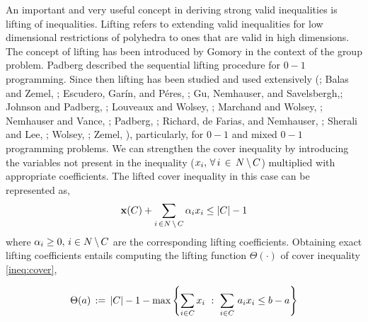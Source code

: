 \documentclass[10pt,twoside]{amsart}
\begin{document}
An important and very useful concept in deriving strong valid inequalities is lifting of inequalities. Lifting refers to extending valid inequalities for low dimensional restrictions of polyhedra to ones that are valid in high dimensions. The concept of lifting has been introduced by Gomory \cite{Gomory1969451} in the context of the group problem. Padberg \cite{Padberg75} described the sequential lifting procedure for $0-1$ programming. Since then lifting has been studied and used extensively (\atam \cite{Atamturk04}; Balas and Zemel, \cite{Balas1978}; Escudero, Gar\'{i}n, and P\'{e}res, \cite{Escudero2003211}; Gu, Nemhauser, and Savelsbergh,\cite{Gu1998,Gu1999a,Gu1999b,Gu2000}; Johnson and Padberg, \cite{Johnson198118}; Louveaux and Wolsey, \cite{Louveaux07}; Marchand and Wolsey, \cite{Marchand99}; Nemhauser and Vance, \cite{Nemhauser1994}; Padberg, \cite{Padberg73}; Richard, de Farias, and Nemhauser, \cite{JP2002}; Sherali and Lee, \cite{Sherali95}; Wolsey, \cite{Wolsey1975,Wolsey77}; Zemel, \cite{Zemel78,Zemel89}), particularly, for $0-1$ and mixed $0-1$ programming problems. We can strengthen the cover inequality by introducing the variables not present in the inequality ($x_i,\,\forall\, i \,\in\, N\,\backslash\, C$) multiplied with appropriate coefficients.  The lifted cover inequality in this case can be represented as,
\begin{align}
        \mathbf{x}(C) + \sum_{i\,\in N\,\backslash\, C} \alpha_i x_i \leq |C| - 1 \label{ineq:liftedcover}
\end{align}
where $\alpha_i \geq 0,\,i\in N\,\backslash\, C$ are the corresponding lifting coefficients. Obtaining exact lifting coefficients entails computing the lifting function $\Theta(\cdot)$ of cover inequality \eqref{ineq:cover},

\begin{align}
  \Theta(a) \,:=\, |C| - 1 - \max\left\{ {\sum_{i\in C} x_i} \ : \ {\sum_{i\in C}\, a_ix_i \leq b - a} \right\} \label{func:liftingfn}
\end{align}
\end{document}
